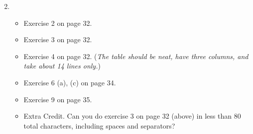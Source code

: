 \documentclass[12pt]{amsart}
\begin{document}
\medskip
\renewcommand{\labelenumi}{{\footnotesize\underline{\textsc{Chapter \arabic{enumi}}}}}
\begin{enumerate}
\setcounter{enumi}{1}
\item ~
    \begin{itemize}
    \item Exercise 2 on page 32.
    \item Exercise 3 on page 32.
    \item Exercise 4 on page 32. (\emph{The table should be neat, have three columns, and take about 14 lines only.})
    \item Exercise 6 (a), (c) on page 34.
    \item Exercise 9 on page 35.
    \item Extra Credit.  Can you do exercise 3 on page 32 (above) in less than 80 total characters, including spaces and separators?
    \end{itemize}
\end{enumerate}
\end{document}
